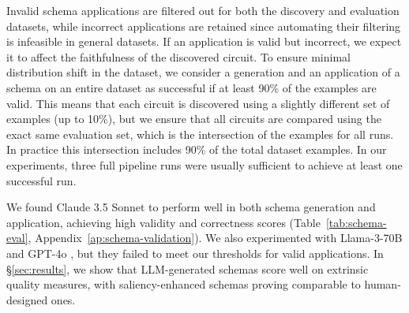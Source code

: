 Invalid schema applications are filtered out for both the discovery and evaluation datasets, while incorrect applications are retained since automating their filtering is infeasible in general datasets.
If an application is valid but incorrect, we expect it to affect the faithfulness of the discovered circuit.
To ensure minimal distribution shift in the dataset, we consider a generation and an application of a schema on an entire dataset as successful if at least 90\% of the examples are valid.
This means that each circuit is discovered using a slightly different set of examples (up to 10\%), but we ensure that all circuits are compared using the exact same evaluation set, which is the intersection of the examples for all runs. In practice this intersection includes 90\% of the total dataset examples.
In our experiments, three full pipeline runs were usually sufficient to achieve at least one successful run.

We found Claude 3.5 Sonnet \citep{claude3} to perform well in both schema generation and application, achieving high validity and correctness scores (Table~\ref{tab:schema-eval}, Appendix~\ref{ap:schema-validation}).
We also experimented with Llama-3-70B \citep{grattafiori2024llama3} and GPT-4o \citep{openai2024gpt4ocard}, but they failed to meet our thresholds for valid applications.
In \S\ref{sec:results}, we show that LLM-generated schemas score well on extrinsic quality measures, with saliency-enhanced schemas proving comparable to human-designed ones.

